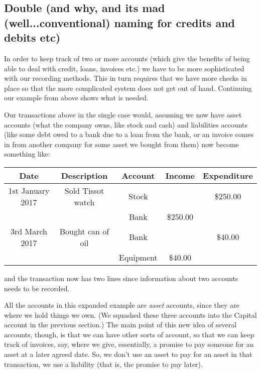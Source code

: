 \documentclass[11pt]{amsart}
\begin{document}
\subsection{Double (and why, and its mad (well...conventional) naming for credits and debits etc)}

In order to keep track of two or more accounts (which give the benefits of being able to deal with credit, loans, invoices etc.)  we have to be more sophisticated with our recording methods. This in turn requires that we have more checks in place so that the more complicated system does not get out of hand. Continuing our example from above shows what is needed.

Our transactions above in the single case would, assuming we now have asset accounts (what the company owns, like stock and cash) and liabilities accounts (like some debt owed to a bank due to a loan from the bank, or an invoice comes in from another company for some asset we bought from them) now become something like:

\begin{table}[h]
\begin{center}
\begin{tabular}{|c|c|c|c|c|}
Date & Description & Account & Income & Expenditure\\
\hline \hline
1st January 2017 & Sold Tissot watch & Stock &   &\$250.00 \\
\hline
& &  Bank & \$250.00 &  \\
\hline \hline
3rd March 2017 &  Bought can of oil & Bank & & \$40.00  \\
\hline
&  &  Equipment & \$40.00 & 
\end{tabular}
\end{center}
\label{default}
\end{table}%

\noindent and the transaction now has two lines since information about two accounts needs to be recorded.

All the accounts in this expanded example are \emph{asset} accounts, since they are where we hold things we own. (We squashed these three accounts into the Capital account in the previous section.) The main point of this new idea of several accounts, though, is that we can have other sorts of account, so that we can keep track of invoices, say, where we give, essentially, a promise to pay someone for an asset at a later agreed date. So, we don't use an asset to pay for an asset in that transaction, we use a liability (that is, the promise to pay later).
\end{document}
